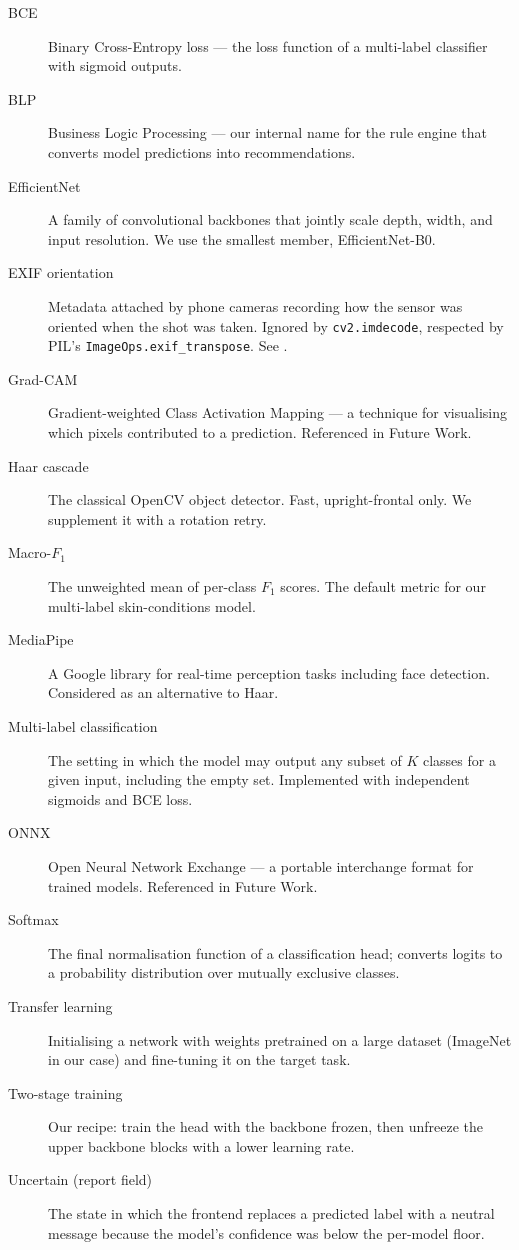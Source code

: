 \documentclass[11pt,a4paper,oneside]{report}
\begin{document}
\begin{description}
    \item[BCE] Binary Cross-Entropy loss --- the loss function of a
        multi-label classifier with sigmoid outputs.
    \item[BLP] Business Logic Processing --- our internal name for
        the rule engine that converts model predictions into
        recommendations.
    \item[EfficientNet] A family of convolutional backbones that
        jointly scale depth, width, and input resolution. We use
        the smallest member, EfficientNet-B0.
    \item[EXIF orientation] Metadata attached by phone cameras
        recording how the sensor was oriented when the shot was
        taken. Ignored by \texttt{cv2.imdecode}, respected by
        PIL's \texttt{ImageOps.exif\_transpose}. See
        .
    \item[Grad-CAM] Gradient-weighted Class Activation Mapping ---
        a technique for visualising which pixels contributed to a
        prediction. Referenced in Future Work.
    \item[Haar cascade] The classical OpenCV object detector.
        Fast, upright-frontal only. We supplement it with a
        rotation retry.
    \item[Macro-\(F_1\)] The unweighted mean of per-class \(F_1\)
        scores. The default metric for our multi-label
        skin-conditions model.
    \item[MediaPipe] A Google library for real-time perception
        tasks including face detection. Considered as an
        alternative to Haar.
    \item[Multi-label classification] The setting in which the
        model may output any subset of \(K\) classes for a given
        input, including the empty set. Implemented with
        independent sigmoids and BCE loss.
    \item[ONNX] Open Neural Network Exchange --- a portable
        interchange format for trained models. Referenced in
        Future Work.
    \item[Softmax] The final normalisation function of a
        classification head; converts logits to a probability
        distribution over mutually exclusive classes.
    \item[Transfer learning] Initialising a network with weights
        pretrained on a large dataset (ImageNet in our case) and
        fine-tuning it on the target task.
    \item[Two-stage training] Our recipe: train the head with the
        backbone frozen, then unfreeze the upper backbone blocks
        with a lower learning rate.
    \item[Uncertain (report field)] The state in which the
        frontend replaces a predicted label with a neutral message
        because the model's confidence was below the per-model
        floor.
\end{description}
\end{document}

